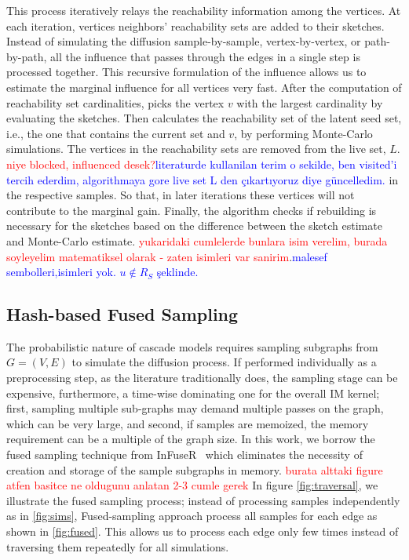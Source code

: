 \documentclass[10pt,journal,compsoc]{IEEEtran}
\newcommand\ggx[1]{\textcolor{blue}{#1}}
\newcommand\acro{{\sc{HyperFuseR\xspace}\xspace}\xspace}
\newcommand\kktodo[1]{\textcolor{red}{#1}}
\begin{document}
This process iteratively relays the reachability information among the vertices. At each iteration, vertices neighbors' reachability sets are added to their sketches.
Instead of simulating the diffusion sample-by-sample, vertex-by-vertex, or path-by-path, all the influence that passes through the edges in a single step is processed together. 
This recursive formulation of the influence allows us to estimate the marginal influence for all vertices very fast. 
After the computation of reachability set cardinalities, \acro picks the vertex $v$ with the largest cardinality by evaluating the sketches. Then \acro calculates the reachability set of the latent seed set, i.e., the one that contains the current set and $v$, by performing Monte-Carlo simulations. The vertices in the reachability sets are removed from the live set, $L$.%
\kktodo{niye blocked, influenced desek?}\ggx{literaturde kullanilan terim o sekilde, ben visited'i tercih ederdim, algorithmaya gore live set L den çıkartıyoruz diye güncelledim.} in the respective samples. So that, in later iterations these vertices will not contribute to the marginal gain. Finally, the algorithm checks if rebuilding is necessary for the sketches based on the difference between the sketch estimate and Monte-Carlo estimate. \kktodo{yukaridaki cumlelerde bunlara isim verelim, burada soyleyelim matematiksel olarak - zaten isimleri var sanirim}.\ggx{malesef sembolleri,isimleri yok. $u \notin R_S$ şeklinde.} 

\subsection{Hash-based Fused Sampling}
The probabilistic nature of cascade models requires sampling subgraphs from $G = (V, E)$ to simulate the diffusion process. If performed individually as a preprocessing step, as the literature traditionally does, the sampling stage can be expensive, furthermore, a time-wise dominating one for the overall IM kernel; first, sampling multiple sub-graphs may demand multiple passes on the graph, which can be very large, and second, if samples are memoized, the memory requirement can be a multiple of the graph size. 
In this work, we borrow the fused sampling technique from {\sc InFuseR}~\cite{infuser} which eliminates the necessity of creation and storage of the sample subgraphs in memory. 
\kktodo{burata alttaki figure atfen basitce ne oldugunu anlatan 2-3 cumle gerek} 
In figure \ref{fig:traversal}, we illustrate the fused sampling process; instead of processing samples independently as in \ref{fig:sims}, Fused-sampling approach process all samples for each edge as shown in \ref{fig:fused}. This allows us to process each edge only few times instead of traversing them repeatedly for all simulations.
\end{document}
